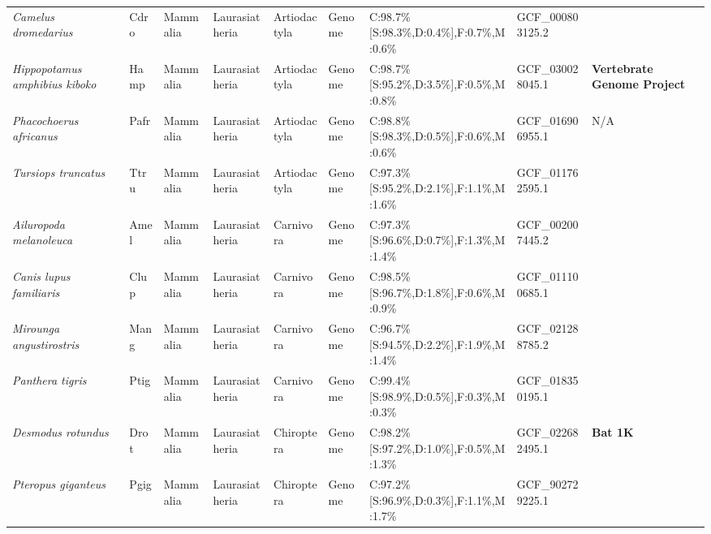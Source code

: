 \documentclass[../main.tex]{subfiles}
\begin{document}
\begin{landscape}
\begin{longtable}{lllllllll}
		\textit{Camelus dromedarius}            & Cdro        & Mammalia       & Laurasiatheria   & Artiodactyla    & Genome        & C:98.7\%{[}S:98.3\%,D:0.4\%{]},F:0.7\%,M:0.6\% & GCF\_000803125.2       & \textbf{\cite{elbers2019improving}}       \\
		\textit{Hippopotamus amphibius kiboko}  & Hamp        & Mammalia       & Laurasiatheria   & Artiodactyla    & Genome        & C:98.7\%{[}S:95.2\%,D:3.5\%{]},F:0.5\%,M:0.8\% & GCF\_030028045.1       & \textbf{Vertebrate Genome Project}        \\
		\textit{Phacochoerus africanus}         & Pafr        & Mammalia       & Laurasiatheria   & Artiodactyla    & Genome        & C:98.8\%{[}S:98.3\%,D:0.5\%{]},F:0.6\%,M:0.6\% & GCF\_016906955.1       & N/A                                       \\
		\textit{Tursiops truncatus}             & Ttru        & Mammalia       & Laurasiatheria   & Artiodactyla    & Genome        & C:97.3\%{[}S:95.2\%,D:2.1\%{]},F:1.1\%,M:1.6\% & GCF\_011762595.1       & \textbf{\cite{xiong2009seven}}            \\
		\textit{Ailuropoda melanoleuca}         & Amel        & Mammalia       & Laurasiatheria   & Carnivora       & Genome        & C:97.3\%{[}S:96.6\%,D:0.7\%{]},F:1.3\%,M:1.4\% & GCF\_002007445.2       & \textbf{\cite{fan2019chromosome}}         \\
		\textit{Canis lupus familiaris}         & Clup        & Mammalia       & Laurasiatheria   & Carnivora       & Genome        & C:98.5\%{[}S:96.7\%,D:1.8\%{]},F:0.6\%,M:0.9\% & GCF\_011100685.1       & \textbf{\cite{wang2021novel}}             \\
		\textit{Mirounga angustirostris}        & Mang        & Mammalia       & Laurasiatheria   & Carnivora       & Genome        & C:96.7\%{[}S:94.5\%,D:2.2\%{]},F:1.9\%,M:1.4\% & GCF\_021288785.2       & \textbf{\cite{moreno2024emx2}}            \\
		\textit{Panthera tigris}                & Ptig        & Mammalia       & Laurasiatheria   & Carnivora       & Genome        & C:99.4\%{[}S:98.9\%,D:0.5\%{]},F:0.3\%,M:0.3\% & GCF\_018350195.1       & \textbf{\cite{bredemeyer2023single}}      \\
		\textit{Desmodus rotundus}              & Drot        & Mammalia       & Laurasiatheria   & Chiroptera      & Genome        & C:98.2\%{[}S:97.2\%,D:1.0\%{]},F:0.5\%,M:1.3\% & GCF\_022682495.1       & \textbf{Bat 1K}                           \\
		\textit{Pteropus giganteus}             & Pgig        & Mammalia       & Laurasiatheria   & Chiroptera      & Genome        & C:97.2\%{[}S:96.9\%,D:0.3\%{]},F:1.1\%,M:1.7\% & GCF\_902729225.1       & \textbf{\cite{fouret2020sequencing}}      \\

\end{longtable}
\end{landscape}
\end{document}
